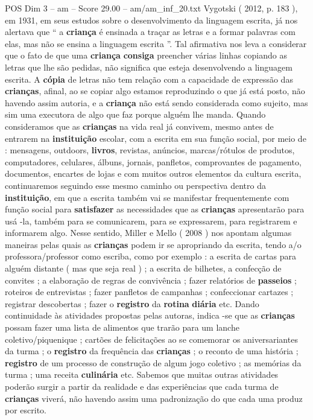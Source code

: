 \begin{textsample}{POS Dim 3 – am – Score 29.00 – am/am\_inf\_20.txt}
Vygotski ( 2012, p. 183 ), em 1931, em seus estudos sobre o desenvolvimento da linguagem escrita, já nos alertava que “ a \textbf{criança} é ensinada a traçar as letras e a formar palavras com elas, mas não se ensina a linguagem escrita ”.
Tal afirmativa nos leva a considerar que o fato de que uma \textbf{criança} \textbf{consiga} preencher várias linhas copiando as letras que lhe são pedidas, não significa que esteja desenvolvendo a linguagem escrita.
A \textbf{cópia} de letras não tem relação com a capacidade de expressão das \textbf{crianças}, afinal, ao se copiar algo estamos reproduzindo o que já está posto, não havendo assim autoria, e a \textbf{criança} não está sendo considerada como sujeito, mas sim uma executora de algo que faz porque alguém lhe manda.
Quando consideramos que as \textbf{crianças} na vida real já convivem, mesmo antes de entrarem na \textbf{instituição} escolar, com a escrita em sua função social, por meio de : mensagens, outdoors, \textbf{livros}, revistas, anúncios, marcas/rótulos de produtos, computadores, celulares, álbuns, jornais, panfletos, comprovantes de pagamento, documentos, encartes de lojas e com muitos outros elementos da cultura escrita, continuaremos seguindo esse mesmo caminho ou perspectiva dentro da \textbf{instituição}, em que a escrita também vai se manifestar frequentemente com função social para \textbf{satisfazer} as necessidades que as \textbf{crianças} apresentarão para usá -la, também para se comunicarem, para se expressarem, para registrarem e informarem algo.
Nesse sentido, Miller e Mello ( 2008 ) nos apontam algumas maneiras pelas quais as \textbf{crianças} podem ir se apropriando da escrita, tendo a/o professora/professor como escriba, como por exemplo : a escrita de cartas para alguém distante ( mas que seja real ) ; a escrita de bilhetes, a confecção de convites ; a elaboração de regras de convivência ; fazer relatórios de \textbf{passeios} ; roteiros de entrevistas ; fazer panfletos de campanhas ; confeccionar cartazes ; registrar descobertas ; fazer o \textbf{registro} da \textbf{rotina} \textbf{diária} etc.
Dando continuidade às atividades propostas pelas autoras, indica -se que as \textbf{crianças} possam fazer uma lista de alimentos que trarão para um lanche coletivo/piquenique ; cartões de felicitações ao se comemorar os aniversariantes da turma ; o \textbf{registro} da frequência das \textbf{crianças} ; o reconto de uma história ; \textbf{registro} de um processo de construção de algum jogo coletivo ; as memórias da turma ; uma receita \textbf{culinária} etc.
Sabemos que muitas outras atividades poderão surgir a partir da realidade e das experiências que cada turma de \textbf{crianças} viverá, não havendo assim uma padronização do que cada uma produz por escrito.

\end{textsample}
